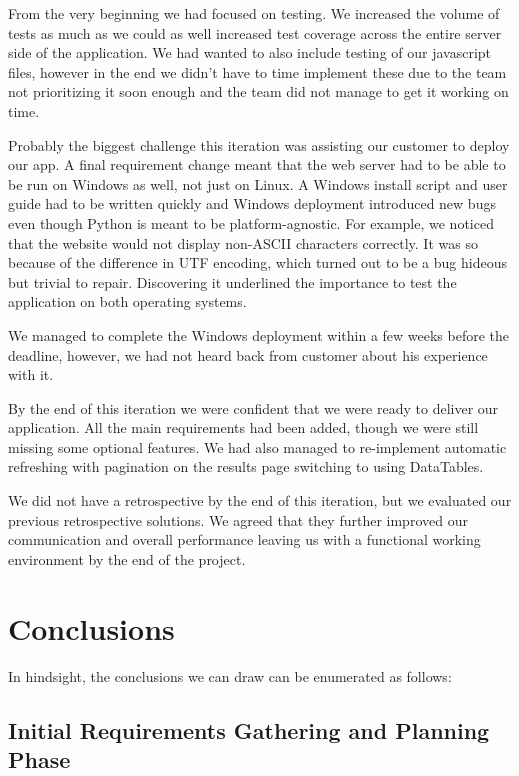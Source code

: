 \documentclass{l3proj}
\begin{document}
From the very beginning we had focused on testing.  We increased the volume of tests as much as we could as well increased test coverage across the entire server side of the application. We had wanted to also include testing of our javascript files, however in the end we didn’t have to time implement these due to the team not prioritizing it soon enough and the team did not manage to get it working on time.


Probably the biggest challenge this iteration was assisting our customer to deploy our app. A final requirement change meant that the web server had to be able to be run on Windows as well, not just on Linux. A Windows install script and user guide had to be written quickly and Windows deployment introduced new bugs even though Python is meant to be platform-agnostic. For example, we noticed that the website would not display non-ASCII characters correctly. It was so because of the difference in UTF encoding, which turned out to be a bug hideous but trivial to repair. Discovering it underlined the importance to test the application on both operating systems.

We managed to complete the Windows deployment within a few weeks before the deadline, however, we had not heard back from customer about his experience with it. 

By the end of this iteration we were confident that we were ready to deliver our application. All the main requirements had been added, though we were still missing some optional features. We had also managed to re-implement automatic refreshing with pagination on the results page switching to using DataTables.

We did not have a retrospective by the end of this iteration, but we evaluated our previous retrospective solutions. We agreed that they further improved our communication and overall performance leaving us with a functional working environment by the end of the project.

\section{Conclusions}

In hindsight, the conclusions we can draw can be enumerated as follows:

\subsection{Initial Requirements Gathering and Planning Phase}
\end{document}
